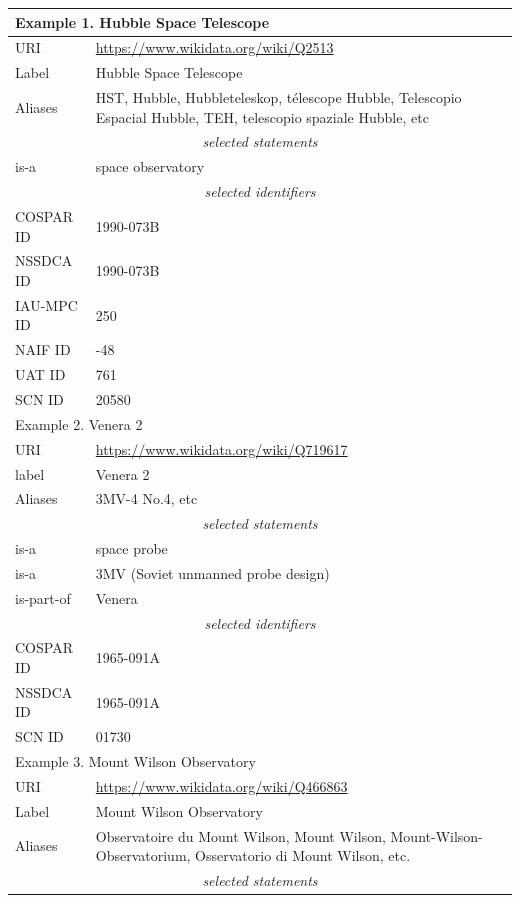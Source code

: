 \documentclass[11pt,a4paper]{ivoa}
\begin{document}
\noindent\begin{longtable}{p{}p{}}
\hline
\hline
\multicolumn{2}{l}{\bf Example 1. Hubble Space Telescope}\\
\hline
URI        & \url{https://www.wikidata.org/wiki/Q2513}\\
Label      & Hubble Space Telescope \\
Aliases    & HST, Hubble, Hubbleteleskop, t\'elescope Hubble, Telescopio Espacial Hubble, TEH, telescopio spaziale Hubble, etc\\
\multicolumn{2}{c}{\sl selected statements}\\
is-a & space observatory \\
\multicolumn{2}{c}{\sl selected identifiers}\\
COSPAR ID  & 1990-073B \\
NSSDCA ID  & 1990-073B \\
IAU-MPC ID & 250\\
NAIF ID    & -48\\
UAT ID     & 761\\
SCN ID     & 20580 \\
\hline
\hline
\multicolumn{2}{l}{Example 2. Venera 2}\\
\hline
URI & \url{https://www.wikidata.org/wiki/Q719617}\\
label      & Venera 2\\
Aliases    & 3MV-4 No.4, etc\\
\multicolumn{2}{c}{\sl selected statements}\\
is-a & space probe \\
is-a & 3MV (Soviet unmanned probe design) \\
is-part-of     & Venera \\
\multicolumn{2}{c}{\sl selected identifiers}\\
COSPAR ID  & 1965-091A \\
NSSDCA ID  & 1965-091A \\
SCN ID     & 01730 \\
\hline
\hline
\multicolumn{2}{l}{Example 3. Mount Wilson Observatory}\\
\hline
URI & \url{https://www.wikidata.org/wiki/Q466863}\\
Label      & Mount Wilson Observatory\\
Aliases    & Observatoire du Mount Wilson, Mount Wilson, Mount-Wilson-Observatorium, Osservatorio di Mount Wilson, etc.\\
\multicolumn{2}{c}{\sl selected statements}\\

\end{longtable}
\end{document}
